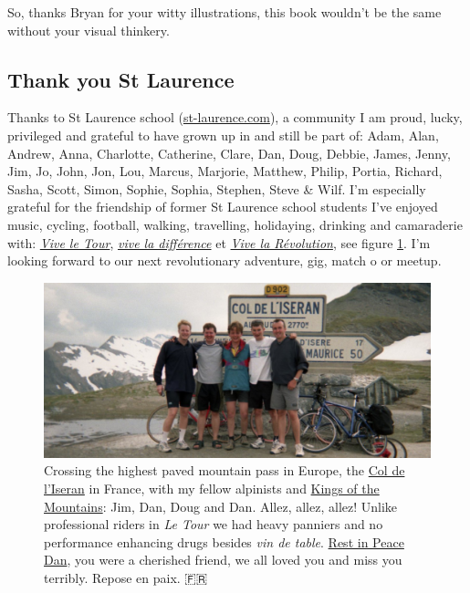\documentclass[
]{book}
\begin{document}
So, thanks Bryan for your witty illustrations, this book wouldn't be the same without your visual thinkery. 🙏

\hypertarget{st-laurence}{%
\subsection{Thank you St Laurence}\label{st-laurence}}

Thanks to St Laurence school (\href{https://st-laurence.com/}{st-laurence.com}), a community I am proud, lucky, privileged and grateful to have grown up in and still be part of: Adam, Alan, Andrew, Anna, Charlotte, Catherine, Clare, Dan, Doug, Debbie, James, Jenny, Jim, Jo, John, Jon, Lou, Marcus, Marjorie, Matthew, Philip, Portia, Richard, Sasha, Scott, Simon, Sophie, Sophia, Stephen, Steve \& Wilf. I'm especially grateful for the friendship of former St Laurence school students I've enjoyed music, cycling, football, walking, travelling, holidaying, drinking and camaraderie with: \emph{\href{https://en.wikipedia.org/wiki/Vive_le_Tour}{Vive le Tour}}, \emph{\href{https://en.wiktionary.org/wiki/vive_la_diff\%C3\%A9rence}{vive la différence}} et \emph{\href{https://en.wikipedia.org/wiki/Viva_la_revoluci\%C3\%B3n}{Vive la Révolution}}, see figure \ref{fig:bradlads-fig}. I'm looking forward to our next revolutionary adventure, gig, match o or meetup.

\begin{figure}

{\centering \includegraphics[width=1\linewidth]{images/kings-of-the-mountains-col-deliseran} 

}

\caption{Crossing the highest paved mountain pass in Europe, the \href{https://en.wikipedia.org/wiki/Col_de_l\%27Iseran}{Col de l'Iseran} in France, with my fellow alpinists and \href{https://en.wikipedia.org/wiki/King_of_the_Mountains}{Kings of the Mountains}: Jim, Dan, Doug and Dan. Allez, allez, allez! Unlike professional riders in \emph{Le Tour} we had heavy panniers and no performance enhancing drugs besides \emph{vin de table}. \href{https://www.wiltshiretimes.co.uk/announcements/deaths/deaths/14828732.Daniel_Feane/}{Rest in Peace Dan}, you were a cherished friend, we all loved you and miss you terribly. Repose en paix. 🇫🇷}\label{fig:bradlads-fig}
\end{figure}
\end{document}
